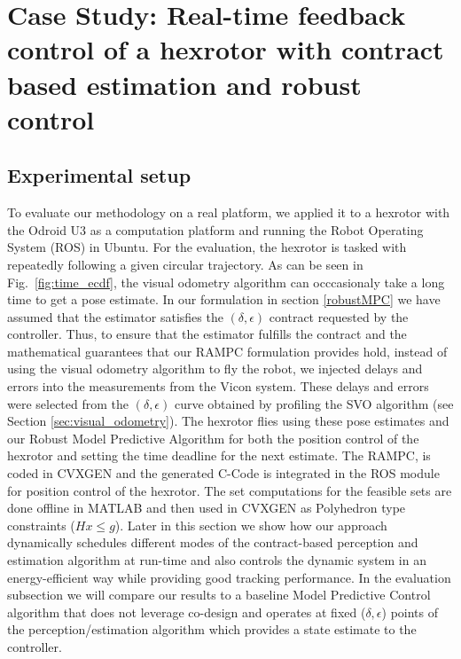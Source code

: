 \section{Case Study: Real-time feedback control of a hexrotor with contract based estimation and robust control}
\label{sec:experiments}

\subsection{Experimental setup}
To evaluate our methodology on a real platform, we applied it to a hexrotor with the Odroid U3 as a computation platform and running the Robot Operating System (ROS) in Ubuntu. For the evaluation, the hexrotor is tasked with repeatedly following a given circular trajectory.
As can be seen in Fig.~\ref{fig:time_ecdf}, the visual odometry algorithm can occcasionaly take a long time to get a pose estimate. In our formulation in section \ref{robustMPC} we have assumed that the estimator satisfies the $(\delta, \epsilon)$ contract requested by the controller. Thus, to ensure that the estimator fulfills the contract and the mathematical guarantees that our RAMPC formulation provides hold, instead of using the visual odometry algorithm to fly the robot, we injected delays and errors into the measurements from the Vicon system. These delays and errors were selected from the $(\delta,\epsilon)$ curve obtained by profiling the SVO algorithm (see Section \ref{sec:visual_odometry}).
The hexrotor flies using these pose estimates and our Robust Model Predictive Algorithm for both the position control of the hexrotor and setting the time deadline for the next estimate. The RAMPC, is coded in CVXGEN \cite{} and the generated C-Code is integrated in the ROS module for position control of the hexrotor. The set computations for the feasible sets are done offline in MATLAB and then used in CVXGEN as Polyhedron type constraints ($Hx \le g$). 
Later in this section we show how our approach dynamically schedules different modes of the contract-based perception and estimation algorithm at run-time and also controls the dynamic system in an energy-efficient way while providing good tracking performance. In the evaluation subsection we will compare our results to a baseline Model Predictive Control algorithm that does not leverage co-design and operates at fixed ($\delta,\epsilon$) points of the perception/estimation algorithm which provides a state estimate to the controller.

